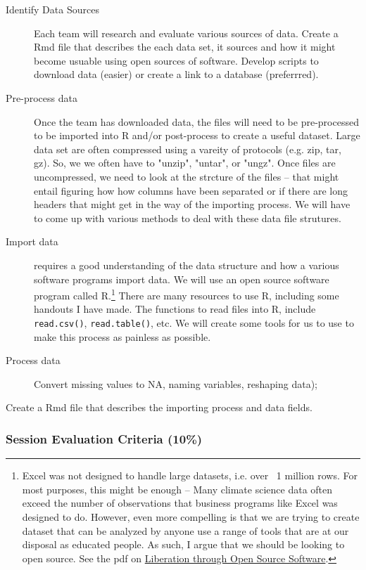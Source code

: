 \documentclass{article}\usepackage[]{graphicx}\usepackage[]{color}
\begin{document}
\begin{description}
  \item[Identify Data Sources] Each team will research and evaluate various sources of data. Create a Rmd file that describes the each data set, it sources and how it might become usuable using open sources of software. Develop scripts to download data (easier) or create a link to a database (preferrred). 
  \item[Pre-process data] Once the team has downloaded data, the files will need to be pre-processed to be imported into R and/or post-process to create a useful dataset. Large data set are often compressed using a vareity of protocols (e.g. zip, tar, gz). So, we we often have to "unzip", "untar", or "ungz". Once files are uncompressed, we need to look at the strcture of the files -- that might entail figuring how how columns have been separated or if there are long headers that might get in the way of the importing process. We will have to come up with various methods to deal with these data file strutures. 
  \item[Import data] requires a good understanding of the data structure and how a various software programs import data. We will use an open source software program called R.\footnote{Excel was not designed to handle large datasets, i.e. over ~1 million rows. For most purposes, this might be enough -- Many climate science data often exceed the number of observations that business programs like Excel was designed to do. However, even more compelling is that we are trying to create dataset that can be analyzed by anyone use a range of tools that are at our disposal as educated people. As such, I argue that we should be looking to open source. See the pdf on \href{https://rstudio.campus.pomona.edu/s/c2d027b9f6ba35ba4d250/files/github/Climate_Change_Narratives/Data/Liberation_via_Open_Source_Software.pdf}{Liberation through Open Source Software}.
} There are many resources to use R, including some handouts I have made. The functions to read files into R, include \texttt{read.csv()}, \texttt{read.table()}, etc. We will create some tools for us to use to make this process as painless as possible. 
  \item[Process data] Convert missing values to NA, naming variables, reshaping data);
\end{description}

Create a Rmd file that describes the importing process and data fields.

\subsubsection{Session Evaluation Criteria (10\%)}
\end{document}
